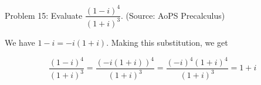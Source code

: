 Problem 15: Evaluate $\dfrac{(1 - i)^4}{(1 + i)^3}$. (Source: AoPS Precalculus)

We have $1 - i = -i(1 + i)$. Making this substitution, we get

\[ \frac{(1 - i)^4}{(1 + i)^3} = \frac{(-i(1 + i))^4}{(1 + i)^3} = \frac{(-i)^4(1 + i)^4}{(1 + i)^3} = \boxed{1 + i} \]
